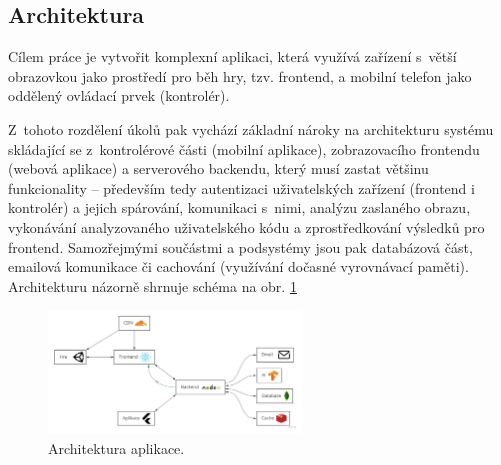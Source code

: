 \subsection{Architektura}

Cílem práce je vytvořit komplexní aplikaci, která využívá zařízení s~větší obrazovkou jako prostředí pro běh hry, tzv. frontend, a mobilní telefon jako oddělený ovládací prvek (kontrolér). \par
Z~tohoto rozdělení úkolů pak vychází základní nároky na architekturu systému skládající se z~kontrolérové části (mobilní aplikace), zobrazovacího frontendu (webová aplikace) a serverového backendu, který musí zastat většinu funkcionality – především tedy autentizaci uživatelských zařízení (frontend i kontrolér) a jejich spárování, komunikaci s~nimi, analýzu zaslaného obrazu, vykonávání analyzovaného uživatelského kódu a zprostředkování výsledků pro frontend. Samozřejmými součástmi a podsystémy jsou pak databázová část, emailová komunikace či cachování (využívání dočasné vyrovnávací paměti). Architekturu názorně shrnuje schéma na obr. \ref{fig:architektura}

\begin{figure}[h]
    \centering
    \includegraphics[width=0.6\textwidth]{img/architektura.jpg}
    \caption{Architektura aplikace.}
    \label{fig:architektura}
\end{figure}